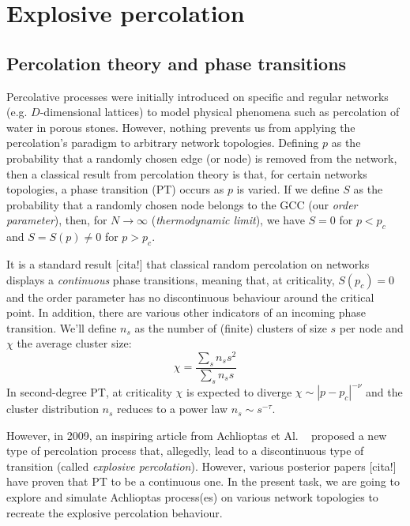 \chapter{Explosive percolation}




\section{Percolation theory and phase transitions}

Percolative processes were initially introduced on specific and regular networks (e.g. $D$-dimensional lattices) to model physical phenomena such as percolation of water in porous stones. However, nothing prevents us from applying the percolation's paradigm to arbitrary network topologies. Defining $p$ as the probability that a randomly chosen edge (or node) is removed from the network, then a classical result from percolation theory is that, for certain networks topologies, a phase transition (PT) occurs as $p$ is varied. If we define $S$ as the probability that a randomly chosen node belongs to the GCC (our \textit{order parameter}), then, for $N \to \infty$ (\textit{thermodynamic limit}), we have $S = 0$ for $p < p_c$ and $S = S(p) \neq 0$ for $p > p_c$.

It is a standard result [cita!] that classical random percolation on networks displays a \textit{continuous} phase transitions, meaning that, at criticality, $S(p_c) = 0$ and the order parameter has no discontinuous behaviour around the critical point. In addition, there are various other indicators of an incoming phase transition. We'll define $n_s$ as the number of (finite) clusters of size $s$ per node and $\chi$ the average cluster size:
\begin{equation}
	\chi = \frac{\sum_s n_s s^2}{\sum_s n_s s}
\end{equation}
In second-degree PT, at criticality $\chi$ is expected to diverge $\chi \sim |p-p_c|^{-\nu}$ and the cluster distribution $n_s$ reduces to a power law $n_s \sim s^{-\tau}$.
 
However, in 2009, an inspiring article from Achlioptas et Al. ~\cite{Achlioptas} proposed a new type of percolation process that, allegedly, lead to a discontinuous type of transition (called \textit{explosive percolation}). However, various posterior papers [cita!] have proven that PT to be a continuous one. In the present task, we are going to explore and simulate Achlioptas process(es) on various network topologies to recreate the explosive percolation behaviour.
\label{par::intro}

